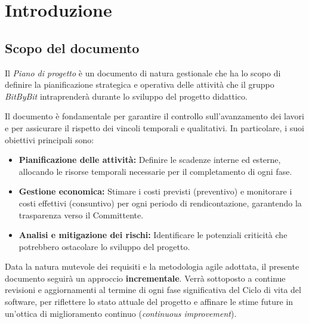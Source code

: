 \documentclass[a4paper,12pt]{article}
\begin{document}
\clearpage
\tableofcontents
\thispagestyle{empty}
\clearpage

\listoftables
\clearpage


\section{Introduzione}

\subsection{Scopo del documento} \label{sec:scopo_documento}
Il \textit{Piano di progetto} è un documento di natura gestionale che ha lo scopo di definire la pianificazione strategica e operativa delle attività che il gruppo \textit{BitByBit} intraprenderà durante lo sviluppo del progetto didattico.

Il documento è fondamentale per garantire il controllo sull'avanzamento dei lavori e per assicurare il rispetto dei vincoli temporali e qualitativi. In particolare, i suoi obiettivi principali sono:

\begin{itemize}
    \item \textbf{Pianificazione delle attività:} Definire le scadenze interne ed esterne, allocando le risorse temporali necessarie per il completamento di ogni fase.
    \item \textbf{Gestione economica:} Stimare i costi previsti (preventivo) e monitorare i costi effettivi (consuntivo) per ogni periodo di rendicontazione, garantendo la trasparenza verso il Committente.
    \item \textbf{Analisi e mitigazione dei rischi:} Identificare le potenziali criticità che potrebbero ostacolare lo sviluppo del progetto.
\end{itemize}

Data la natura mutevole dei requisiti e la metodologia agile adottata, il presente documento seguirà un approccio \textbf{incrementale}. Verrà sottoposto a continue revisioni e aggiornamenti al termine di ogni fase significativa del Ciclo di vita del software, per riflettere lo stato attuale del progetto e affinare le stime future in un'ottica di miglioramento continuo (\textit{continuous improvement}).
\end{document}
